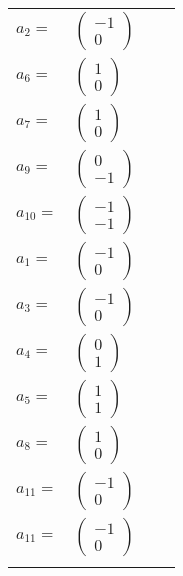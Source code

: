 \documentclass[1p]{elsarticle_modified}
\theoremstyle{definition}
\begin{document}
\begin{tabular}{m{7pt} m{180pt} m{7pt} m{180pt} }
\flushright $a_{2}=$&$\begin{pmatrix}-1\\0\end{pmatrix}$ \\
\flushright $a_{6}=$&$\begin{pmatrix}1\\0\end{pmatrix}$ \\
\flushright $a_{7}=$&$\begin{pmatrix}1\\0\end{pmatrix}$ \\
\flushright $a_{9}=$&$\begin{pmatrix}0\\-1\end{pmatrix}$ \\
\flushright $a_{10}=$&$\begin{pmatrix}-1\\-1\end{pmatrix}$ \\
\flushright $a_{1}=$&$\begin{pmatrix}-1\\0\end{pmatrix}$ \\
\flushright $a_{3}=$&$\begin{pmatrix}-1\\0\end{pmatrix}$ \\
\flushright $a_{4}=$&$\begin{pmatrix}0\\1\end{pmatrix}$ \\
\flushright $a_{5}=$&$\begin{pmatrix}1\\1\end{pmatrix}$ \\
\flushright $a_{8}=$&$\begin{pmatrix}1\\0\end{pmatrix}$ \\
\flushright $a_{11}=$&$\begin{pmatrix}-1\\0\end{pmatrix}$\\ \flushright $a_{11}=$&$\begin{pmatrix}-1\\0\end{pmatrix}$\\&\end{tabular}
\end{document}
